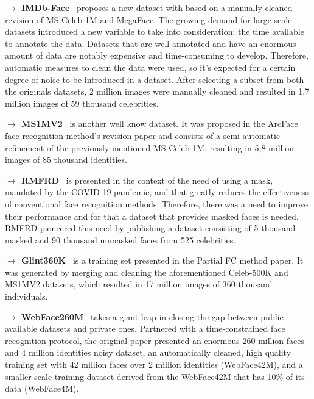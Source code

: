 \documentclass[class=report, crop=false, a4paper, 12pt]{standalone}
\begin{document}
\vspace{0.7\baselineskip}
\noindent\textbf{$\rightarrow$ IMDb-Face}~\autocite{wangDevilFaceRecognition2018} proposes a new dataset with based on a manually cleaned revision of MS-Celeb-1M and MegaFace. The growing demand for large-scale datasets introduced a new variable to take into consideration: the time available to annotate the data. Datasets that are well-annotated and have an enormous amount of data are notably expensive and time-consuming to develop. Therefore, automatic measures to clean the data were used, so it's expected for a certain degree of noise to be introduced in a dataset. After selecting a subset from both the originals datasets, 2 million images were manually cleaned and resulted in 1,7 million images of 59 thousand celebrities.

\vspace{0.7\baselineskip}
\noindent\textbf{$\rightarrow$ MS1MV2}~\autocite{dengArcFaceAdditiveAngular} is another well know dataset. It was proposed in the ArcFace face recognition method's revision paper and consists of a semi-automatic refinement of the previously mentioned MS-Celeb-1M, resulting in 5,8 million images of 85 thousand identities.

\vspace{0.7\baselineskip}
\noindent\textbf{$\rightarrow$ RMFRD}~\autocite{wangMaskedFaceRecognition2020} is presented in the context of the need of using a mask, mandated by the COVID-19 pandemic, and that greatly reduces the effectiveness of conventional face recognition methods. Therefore, there was a need to improve their performance and for that a dataset that provides masked faces is needed. RMFRD pioneered this need by publishing a dataset consisting of 5 thousand masked and 90 thousand unmasked faces from 525 celebrities.

\vspace{0.7\baselineskip}
\noindent\textbf{$\rightarrow$ Glint360K}~\autocite{anPartialFCTraining2021} is a training set presented in the Partial FC method paper. It was generated by merging and cleaning the aforementioned Celeb-500K and MS1MV2 datasets, which resulted in 17 million images of 360 thousand individuals.

\vspace{0.7\baselineskip}
\noindent\textbf{$\rightarrow$ WebFace260M}~\autocite{zhuWebFace260MBenchmarkUnveiling2021} takes a giant leap in closing the gap between public available datasets and private ones. Partnered with a time-constrained face recognition protocol, the original paper presented an enormous 260 million faces and 4 million identities noisy dataset, an automatically cleaned, high quality training set with 42 million faces over 2 million identities (WebFace42M), and a smaller scale training dataset derived from the WebFace42M that has 10\% of its data (WebFace4M).
\end{document}
